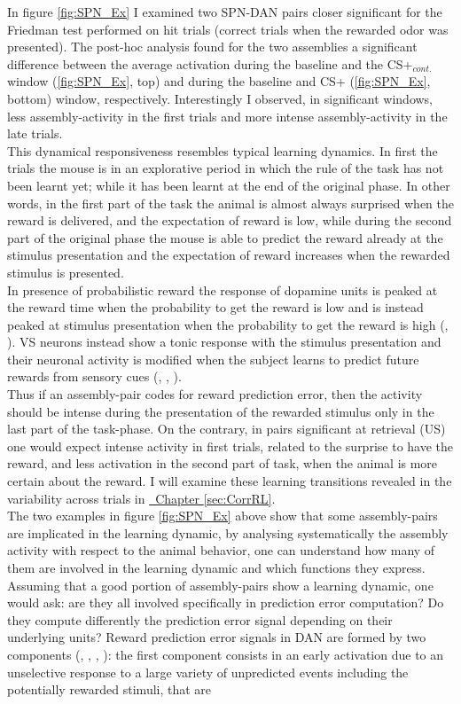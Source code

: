 In figure \ref{fig:SPN_Ex} I examined two SPN-DAN pairs closer significant for the Friedman test performed on hit trials (correct trials when the rewarded odor was presented). The post-hoc analysis found for the two assemblies a significant difference between the average activation during the baseline and the CS+$_{cont.}$ window (\ref{fig:SPN_Ex}, top) and during the baseline and CS+ (\ref{fig:SPN_Ex}, bottom) window, respectively. Interestingly I observed, in significant windows, less assembly-activity in the first trials and more intense assembly-activity in the late trials.\\This dynamical responsiveness resembles typical learning dynamics. In first the trials the mouse is in an explorative period in which the rule of the task has not been learnt yet; while it has been learnt at the end of the original phase. In other words, in the first part of the task the animal is almost always surprised when the reward is delivered, and the expectation of reward is low, while during the second part of the original phase the mouse is able to predict the reward already at the stimulus presentation and the expectation of reward increases when the rewarded stimulus is presented.\\In presence of probabilistic reward the response of dopamine units is peaked at the reward time when the probability to get the reward is low and is instead peaked at stimulus presentation when the probability to get the reward is high (\cite{Schultz1992}, \cite{Schultz} \cite{Fiorillo}). VS neurons instead show a tonic response with the stimulus presentation and their neuronal activity is modified when the subject learns to predict future rewards from sensory cues (\cite{Pagnoni}, \cite{Schultz2000}, \cite{Radua}).\\Thus if an assembly-pair codes for reward prediction error, then the activity should be intense during the presentation of the rewarded stimulus only in the last part of the task-phase. On the contrary, in pairs significant at retrieval (US) one would expect intense activity in first trials, related to the surprise to have the reward, and less activation in the second part of task, when the animal is more certain about the reward. I will examine these learning transitions revealed in the variability across trials in \hyperref[sec:CorrRL]{~Chapter \ref*{sec:CorrRL}}.\\The two examples in figure \ref{fig:SPN_Ex} above show that some assembly-pairs are implicated in the learning dynamic, by analysing systematically the assembly activity with respect to the animal behavior, one can understand how many of them are involved in the learning dynamic and which functions they express. Assuming that a good portion of assembly-pairs show a learning dynamic, one would ask: are they all involved specifically in prediction error computation? Do they compute differently the prediction error signal depending on their underlying units? Reward prediction error signals in DAN are formed by two components (\cite{Tobler2003}, \cite{Nomoto2010}, \cite{Fiorillo2013}, \cite{Schultz2016}): the first component consists in an early activation due to an unselective response to a large variety of unpredicted events including the potentially rewarded stimuli, that are 
